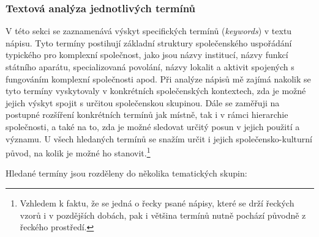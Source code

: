 \subsubsection[textová-analýza-jednotlivých-termínů]{Textová analýza jednotlivých termínů}

V této sekci se zaznamenává výskyt specifických termínů ({\em keywords}) v textu nápisu. Tyto termíny postihují základní struktury společenského uspořádání typického pro komplexní společnost, jako jsou názvy institucí, názvy funkcí státního aparátu, specializovaná povolání, názvy lokalit a aktivit spojených s fungováním komplexní společnosti apod. Při analýze nápisů mě zajímá nakolik se tyto termíny vyskytovaly v konkrétních společenských kontextech, zda je možné jejich výskyt spojit s určitou společenskou skupinou. Dále se zaměřuji na postupné rozšíření konkrétních termínů jak místně, tak i v rámci hierarchie společnosti, a také na to, zda je možné sledovat určitý posun v jejich použití a významu. U všech hledaných termínů se snažím určit i jejich společensko-kulturní původ, na kolik je možné ho stanovit.\footnote{Vzhledem k faktu, že se jedná o řecky psané nápisy, které se drží řeckých vzorů i v pozdějších dobách, pak i většina termínů nutně pochází původně z řeckého prostředí.}

Hledané termíny jsou rozděleny do několika tematických skupin:

